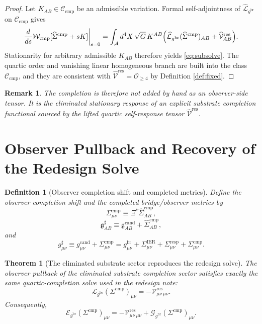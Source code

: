 \documentclass[11pt]{article}
\newcommand{\Sub}{\mathcal A}
\newcommand{\ObserverMap}{\Xi}
\newcommand{\BridgeMetric}{\mathfrak g}
\newcommand{\ObserverMetric}{g^{\mathrm{br}}}
\newcommand{\CandidateMetric}{g^{\mathrm{cand}}}
\newcommand{\CompletedMetric}{g^{\sharp}}
\newcommand{\BaseShift}{\Sigma^{\mathrm{IER}}}
\newcommand{\ResponseShift}{\Sigma^{\mathrm{resp}}}
\newcommand{\CompShift}{\Sigma^{\mathrm{cmp}}}
\newcommand{\CompLift}{\widehat\Sigma^{\mathrm{cmp}}}
\newcommand{\ResidualCore}{\mathcal V_{\mu\nu}^{\mathrm{res}}}
\newcommand{\ResidualLift}{\widehat{\mathcal V}^{\mathrm{res}}}
\newcommand{\CompFunctional}{\mathcal W_{\mathrm{cmp}}}
\newcommand{\SubReducedEin}{\widehat{\mathcal L}_{\ObserverMetric}}
\newcommand{\ReducedEin}{\mathcal L_{\ObserverMetric}}
\newcommand{\GaugeBook}{\mathcal G_{\ObserverMetric}}
\newcommand{\EinLin}{\mathcal E_{\ObserverMetric}}
\newcommand{\CompClass}{\mathscr C_{\mathrm{cmp}}}
\newtheorem{definition}{Definition}
\newtheorem{remark}{Remark}
\newtheorem{theorem}{Theorem}
\begin{document}
\begin{proof}
Let \(K_{AB}\in\CompClass\) be an admissible variation. Formal self-adjointness of \(\SubReducedEin\) on \(\CompClass\) gives
\[
\frac{d}{ds}\CompFunctional[\CompLift+sK]\biggr|_{s=0}
=
\int_{\Sub} d^4X\,\sqrt{G}\,
K^{AB}\Bigl(\SubReducedEin(\CompLift)_{AB}+\ResidualLift_{AB}\Bigr).
\]
Stationarity for arbitrary admissible \(K_{AB}\) therefore yields \eqref{eq:subsolve}. The quartic order and vanishing linear homogeneous branch are built into the class \(\CompClass\), and they are consistent with \(\ResidualLift=\mathcal O_{\ge 4}\) by Definition \ref{def:fixed}.
\end{proof}

\begin{remark}
The completion is therefore not added by hand as an observer-side tensor. It is the eliminated stationary response of an explicit substrate completion functional sourced by the lifted quartic self-response tensor \(\ResidualLift\).
\end{remark}

\section{Observer Pullback and Recovery of the Redesign Solve}

\begin{definition}[Observer completion shift and completed metrics]
\label{def:completed}
Define the observer completion shift and the completed bridge/observer metrics by
\begin{equation}
\CompShift_{\mu\nu}
\equiv
\ObserverMap^*\CompLift_{AB},
\label{eq:defsigma}
\end{equation}
\begin{equation}
\BridgeMetric_{AB}^{\sharp}
\equiv
\BridgeMetric_{AB}^{\mathrm{cand}}+\CompLift_{AB},
\label{eq:bridgecompleted}
\end{equation}
and
\begin{equation}
\CompletedMetric_{\mu\nu}
\equiv
\CandidateMetric_{\mu\nu}+\CompShift_{\mu\nu}
=
\ObserverMetric_{\mu\nu}
+\BaseShift_{\mu\nu}
+\ResponseShift_{\mu\nu}
+\CompShift_{\mu\nu}.
\label{eq:gsharp}
\end{equation}
\end{definition}

\begin{theorem}[The eliminated substrate sector reproduces the redesign solve]
\label{thm:pullback}
The observer pullback of the eliminated substrate completion sector satisfies exactly the same quartic-completion solve used in the redesign note:
\begin{equation}
\ReducedEin(\CompShift)_{\mu\nu}
=
-\ResidualCore{}_{\mu\nu}.
\label{eq:observereq}
\end{equation}
Consequently,
\begin{equation}
\EinLin(\CompShift)_{\mu\nu}
=
-\ResidualCore{}_{\mu\nu}
+\GaugeBook(\CompShift)_{\mu\nu}.
\label{eq:linsolve}
\end{equation}
\end{theorem}
\end{document}
